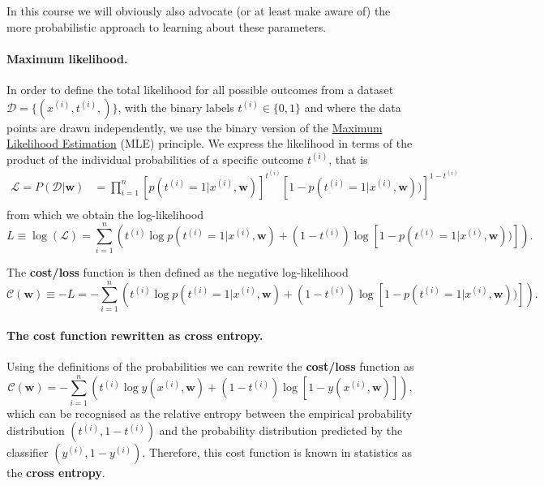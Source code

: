 \documentclass[%
oneside,                 %
final,                   %
10pt]{article}
\begin{document}
In this course we will obviously also advocate (or at least make aware of) the more probabilistic approach to learning about these parameters.

\paragraph{Maximum likelihood.}
In order to define the total likelihood for all possible outcomes from a  
dataset $\mathcal{D}=\{(x^{(i)}, t^{(i)},)\}$, with the binary labels
$t^{(i)}\in\{0,1\}$ and where the data points are drawn independently, we use the binary version of the \href{{https://en.wikipedia.org/wiki/Maximum_likelihood_estimation}}{Maximum Likelihood Estimation} (MLE) principle. 
We express the 
likelihood in terms of the product of the individual probabilities of a specific outcome $t^{(i)}$, that is 
\begin{align*}
\mathcal{L} = P(\mathcal{D}|\boldsymbol{w})& = \prod_{i=1}^n \left[p(t^{(i)}=1|x^{(i)},\boldsymbol{w})\right]^{t^{(i)}}\left[1-p(t^{(i)}=1|x^{(i)},\boldsymbol{w}))\right]^{1-t^{(i)}}\nonumber \\
\end{align*}
from which we obtain the log-likelihood 
\[
L \equiv \log(\mathcal{L}) = \sum_{i=1}^n \left( t^{(i)}\log{p(t^{(i)}=1|x^{(i)},\boldsymbol{w})} + (1-t^{(i)})\log\left[1-p(t^{(i)}=1|x^{(i)},\boldsymbol{w}))\right]\right).
\]

The \textbf{cost/loss} function is then defined as the negative log-likelihood
\[
\mathcal{C}(\boldsymbol{w}) \equiv -L = -\sum_{i=1}^n \left( t^{(i)}\log{p(t^{(i)}=1|x^{(i)},\boldsymbol{w})} + (1-t^{(i)})\log\left[1-p(t^{(i)}=1|x^{(i)},\boldsymbol{w}))\right]\right).
\]

\paragraph{The cost function rewritten as cross entropy.}
Using the definitions of the probabilities we can rewrite the \textbf{cost/loss} function as
\[
\mathcal{C}(\boldsymbol{w}) = -\sum_{i=1}^n \left( t^{(i)}\log{ y(x^{(i)},\boldsymbol{w})} + (1-t^{(i)})\log\left[ 1-y( x^{(i)},\boldsymbol{w}) \right] \right),
\]
which can be recognised as the relative entropy between the empirical probability distribution $(t^{(i)}, 1-t^{(i)})$ and the probability distribution predicted by the classifier $(y^{(i)}, 1-y^{(i)})$.
Therefore, this cost function is known in statistics as the \textbf{cross entropy}. 
\end{document}
